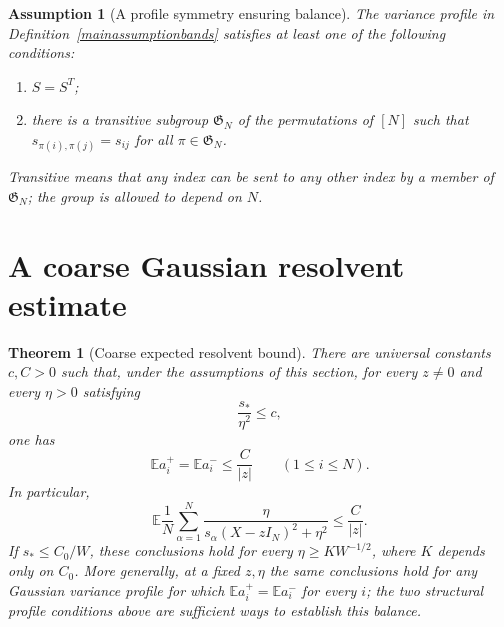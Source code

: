 \documentclass[10pt,a4paper]{amsart}
\newtheorem{assumption}{Assumption}
\newtheorem{theorem}{Theorem}
\begin{document}
\begin{assumption}[A profile symmetry ensuring balance]\label{ass:profile-balance}
The variance profile in Definition~\ref{mainassumptionbands} satisfies at
least one of the following conditions:
\begin{enumerate}[label=\textup{(\roman*)}]
\item $S=S^T$;
\item there is a transitive subgroup $\mathfrak G_N$ of the permutations
of $[N]$ such that $s_{\pi(i),\pi(j)}=s_{ij}$ for all $\pi\in\mathfrak G_N$.
\end{enumerate}
Transitive means that any index can be sent to any other index by a member
of $\mathfrak G_N$; the group is allowed to depend on $N$.
\end{assumption}

\section{A coarse Gaussian resolvent estimate}\label{sec:coarse}

\begin{theorem}[Coarse expected resolvent bound]\label{thm:coarse}
There are universal constants $c,C>0$ such that, under the assumptions of
this section, for every $z\ne0$ and every $\eta>0$ satisfying
\begin{equation}\label{eq:coarse-scale-condition}
 \frac{s_*}{\eta^2}\le c,
\end{equation}
one has
\begin{equation}\label{eq:coarse-coordinate-bound}
 \mathbb E a_i^+=\mathbb E a_i^-\le\frac{C}{|z|}
 \qquad (1\le i\le N).
\end{equation}
In particular,
\begin{equation}\label{eq:coarse-trace-bound}
 \mathbb E\frac1N\sum_{\alpha=1}^N
 \frac{\eta}{s_\alpha(X-zI_N)^2+\eta^2}
 \le\frac{C}{|z|}.
\end{equation}
If $s_*\le C_0/W$, these conclusions hold for every
$\eta\ge K W^{-1/2}$, where $K$ depends only on $C_0$.
More generally, at a fixed $z,\eta$ the same conclusions hold for any
Gaussian variance profile for which
$\mathbb E a_i^+=\mathbb E a_i^-$ for every $i$; the two structural
profile conditions above are sufficient ways to establish this balance.
\end{theorem}
\end{document}
